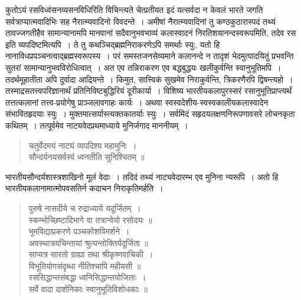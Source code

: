 {\dev कुतोऽयं रसविध्वंसनव्यसनविधिरिति विचिन्त्यते चेत्प्रतीयत इदं यत्सर्वदा न केवलं भारते जगति सर्वत्राप्यात्मवादिभिः सह नैरात्म्यवादिनो विवदन्ते~। अमीषां नैरात्म्यवादिनां तु कण्ठ\-कुठारास्पदं तथ्यं तावज्जगतीहैव सामान्यानामपि मानवानां सदैवानुभवभाव्यं कला\-स्वादनं निरतिशयानन्दस्वरूपमिति, तदेव रस इति व्यपदिष्टमित्यपि~। ते तु कथञ्चिद्ब्रह्मनिरा\-करणेऽपि समर्थाः स्युः, यतो हि नानाविधप्रपञ्चनत्वाद्ब्रह्मस्वरूपस्य~। परं समस्तजनसेव्यमाने कलानन्दे न तादृशं भेदमुत्पादयितुं प्रभवन्ति सुतरां सामान्यानुभवविरोधित्वात्~। अत एव तन्निराकरण एव बद्धबुद्धयः खलीकुर्वन्ति स्वानुभूतिमपि~। तदर्थमूहातीता अपि दुर्वादा आद्रियन्ते~। किमुत, सात्त्विकं सुखमेव निराकुर्वन्ति, त्रिकरणैरपि द्विषन्त्यहो~। तस्माद्रसतत्त्वपरिज्ञानार्थं  प्रतिनिविष्टबुद्धिरियं दूरीकार्या~। विशिष्य भारतीयकलापुरस्सरं रसानुभूतिप्राप्त्यर्थं तत्तत्कलानां तत्त्व-प्रयोगेषु प्राञ्जलावगाहः कार्यः~। अथवा स्वस्वदेशीय-स्वस्वकालीयकलास्वादेन संभा\-वितहृदयाः स्युः~। मुक्तमात्सर्यास्त्यक्तकातर्याः स्युः~। सर्वमिदं सहृदयलक्षणनिरूपणावसरे लोचनकृता कथितम्~। तत्पूर्वमेव नाट्यवेदप्रथमाध्याये मुनिर्जगाद माननीयम्~।}   
\begin{quote}
{\dev चतुर्वेदमयं नाट्यं व्यपदिश्य महामुनिः~।}\\
{\dev सौन्दर्यनयसर्वस्वं ध्वनतीति सुनिश्चितम् ॥}
\end{quote}

{\dev भारतीयसौन्दर्यशास्त्रशाखिनो मूलं वेदाः~। तदिदं तथ्यं नाट्यवेदारम्भ एव मुनिना न्यरूपि~। अतो हि भारतीयकलानामात्मोपवसतिर्न कदाचन निराकृतिमर्हति~।}
\begin{quote}
{\dev पुरुषे नासदीये च रुद्राध्याये यदूर्जितम्~।}\\
{\dev स्कम्भोच्छिष्टादिभागे वा तत्रान्वेयो रसोदयः ॥}\\[5pt]
{\dev भूमविद्याप्रकरणे पञ्चकोशविमर्शने~।}\\
{\dev अवस्थात्रयचिन्तायां श्रुत्यन्तोक्तिर्यदूर्जिता ॥}\\[5pt]
{\dev साप्यत्र सारतो ग्राह्या तथा श्रीकृष्णवाचिकी~।}\\
{\dev विभूतियोगसंदृब्धा नीतिश्चापि महीयसी ॥}\\[5pt]
{\dev रससिद्धान्तसंबद्धा ध्वनिसिद्धान्तयोजिताः~।}\\
{\dev सर्वे वादा दार्शनिकाः स्वानुभूतिविशोधकाः ॥}
\end{quote}

